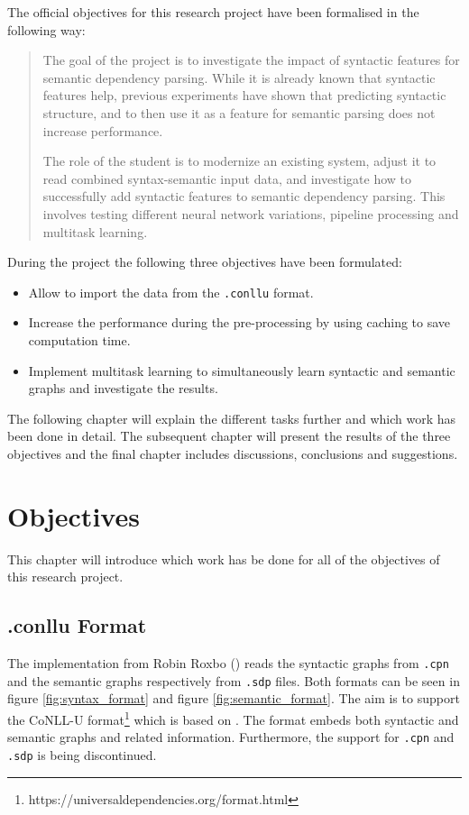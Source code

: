 \documentclass[11pt]{scrartcl}
\begin{document}
The official objectives for this research project have been formalised in the following way:

\begin{quote}
The goal of the project is to investigate the impact of syntactic features for semantic dependency parsing. While it is already known that syntactic features help, previous experiments have shown that predicting syntactic structure, and to then use it as a feature for semantic parsing does not increase performance.

The role of the student is to modernize an existing system, adjust it to read combined syntax-semantic input data, and investigate how to successfully add syntactic features to semantic dependency parsing. This involves testing different neural network variations, pipeline processing and multitask learning.
\end{quote}

During the project the following three objectives have been formulated:

\begin{itemize}
    \item Allow to import the data from the \texttt{.conllu} format.
    \item Increase the performance during the pre-processing by using caching to save computation time.
    \item Implement multitask learning to simultaneously learn syntactic and semantic graphs and investigate the results.
\end{itemize}

The following chapter will explain the different tasks further and which work has been done in detail. The subsequent chapter will present the results of the three objectives and the final chapter includes discussions, conclusions and suggestions.

\section{Objectives}

This chapter will introduce which work has be done for all of the objectives of this research project.

\subsection{.conllu Format}

The implementation from Robin Roxbo (\cite{Roxbo1315439}) reads the syntactic graphs from \texttt{.cpn} and the semantic graphs respectively from \texttt{.sdp} files. Both formats can be seen in figure \ref{fig:syntax_format} and figure \ref{fig:semantic_format}. The aim is to support the CoNLL-U format\footnote{https://universaldependencies.org/format.html} which is based on \cite{10.5555/1596276.1596305}. The format embeds both syntactic and semantic graphs and related information. Furthermore, the support for \texttt{.cpn} and \texttt{.sdp} is being discontinued.
\end{document}
